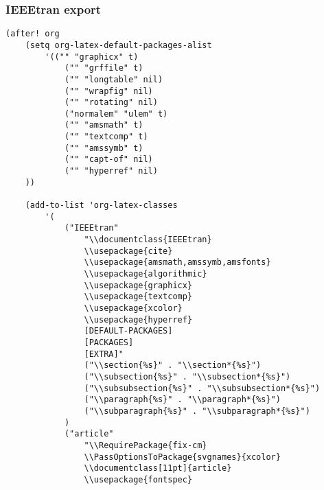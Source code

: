 \documentclass[11pt]{article}
\begin{document}
\subsubsection{IEEEtran export}
\label{sec:org7c4ac5c}
\begin{verbatim}
(after! org
    (setq org-latex-default-packages-alist
        '(("" "graphicx" t)
            ("" "grffile" t)
            ("" "longtable" nil)
            ("" "wrapfig" nil)
            ("" "rotating" nil)
            ("normalem" "ulem" t)
            ("" "amsmath" t)
            ("" "textcomp" t)
            ("" "amssymb" t)
            ("" "capt-of" nil)
            ("" "hyperref" nil)
    ))

    (add-to-list 'org-latex-classes
        '(
            ("IEEEtran"
                "\\documentclass{IEEEtran}
                \\usepackage{cite}
                \\usepackage{amsmath,amssymb,amsfonts}
                \\usepackage{algorithmic}
                \\usepackage{graphicx}
                \\usepackage{textcomp}
                \\usepackage{xcolor}
                \\usepackage{hyperref}
                [DEFAULT-PACKAGES]
                [PACKAGES]
                [EXTRA]"
                ("\\section{%s}" . "\\section*{%s}")
                ("\\subsection{%s}" . "\\subsection*{%s}")
                ("\\subsubsection{%s}" . "\\subsubsection*{%s}")
                ("\\paragraph{%s}" . "\\paragraph*{%s}")
                ("\\subparagraph{%s}" . "\\subparagraph*{%s}")
            )
            ("article"
                "\\RequirePackage{fix-cm}
                \\PassOptionsToPackage{svgnames}{xcolor}
                \\documentclass[11pt]{article}
                \\usepackage{fontspec}

\end{verbatim}
\end{document}
